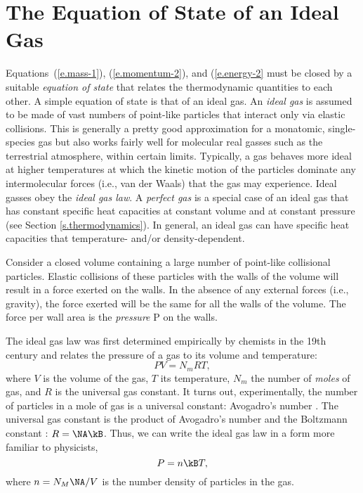 
\section{The Equation of State of an Ideal Gas} \label{s.idealgas}
Equations~(\ref{e.mass-1}), (\ref{e.momentum-2}), and (\ref{e.energy-2} must be closed by a suitable {\it equation of state} that relates the thermodynamic quantities to each other.
A simple equation of state is that of an ideal gas.
An {\it ideal gas} is assumed to be made of vast numbers of point-like particles that interact only via elastic collisions.
This is generally a pretty good approximation for a monatomic, single-species gas but also works fairly well for molecular real gasses such as the terrestrial atmosphere, within certain limits.
Typically, a gas behaves more ideal at higher temperatures at which the kinetic motion of the particles dominate any intermolecular forces (i.e., van der Waals) that the gas may experience.
Ideal gasses obey the {\it ideal gas law}.
A {\it perfect gas} is a special case of an ideal gas that has constant specific heat capacities at constant volume and at constant pressure (see Section \ref{s.thermodynamics}).
In general, an ideal gas can have specific heat capacities that temperature- and/or density-dependent.

Consider a closed volume containing a large number of point-like collisional particles.
Elastic collisions of these particles with the walls of the volume will result in a force exerted on the walls.
In the absence of any external forces (i.e., gravity), the force exerted will be the same for all the walls of the volume.
The force per wall area is the {\it pressure} P on the walls.

The ideal gas law was first determined empirically by chemists in the 19th century and relates the pressure of a gas to its volume and temperature:
\begin{equation}
	PV = N_m R T, \label{e.ideal1}
\end{equation}
where $V$ is the volume of the gas, $T$ its temperature, $N_m$ the number of {\it moles} of gas, and $R$ is the universal gas constant.
It turns out, experimentally, the number of particles in a mole of gas is a universal constant: Avogadro's number \NA.
The universal gas constant is the product of Avogadro's number and the Boltzmann constant \kB: $R=\NA \kB$.
Thus, we can write the ideal gas law in a form more familiar to physicists,
\begin{equation}
	P = n\kB T,\label{e.ideal2}
\end{equation}
where $n = N_M\NA/V$ is the number density of particles in the gas.

